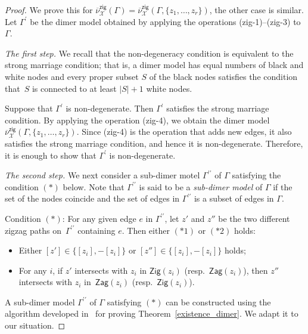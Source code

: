 \documentclass[11pt]{article}
\numberwithin{equation}{section}
\numberwithin{equation}{section}
\numberwithin{figure}{section}
\numberwithin{table}{section}
\newcommand{\calX}{\mathcal{X}}
\newcommand{\Zig}{\mathsf{Zig}}
\newcommand{\Zag}{\mathsf{Zag}}
\newcommand{\zig}{\mathsf{zig}}
\begin{document}
\begin{proof}
We prove this for $\overline{\nu}^\zig_\calX(\Gamma)=\overline{\nu}^\zig_\calX(\Gamma, \{z_1,\dots,z_r\})$, the other case is similar.
Let $\Gamma^\prime$ be the dimer model obtained by applying the operations (zig-1)--(zig-3) to $\Gamma$.

{\it The first step.}
We recall that the non-degeneracy condition is equivalent to the strong marriage condition; that is, a dimer model has equal numbers of black and white nodes and every proper subset $S$ of the black nodes satisfies the condition that~$S$ is connected to at least $|S|+1$ white nodes.

Suppose that $\Gamma^\prime$ is non-degenerate. Then $\Gamma^\prime$ satisfies the strong marriage condition.
By applying the operation (zig-4), we obtain the dimer model $\overline{\nu}^\zig_\calX(\Gamma, \{z_1,\dots,z_r\})$.
Since (zig-4) is the operation that adds new edges, it also satisfies the strong marriage condition, and hence it is non-degenerate.
Therefore, it is enough to show that $\Gamma^\prime$ is non-degenerate.

{\it The second step.}
We next consider a sub-dimer motel $\Gamma^{\prime \prime}$ of $\Gamma$ satisfying the condition $(*)$ below.
Note that $\Gamma^{\prime\prime}$ is said to be a \emph{sub-dimer model} of $\Gamma$
if the set of the nodes coincide and the set of edges in $\Gamma^{\prime\prime}$ is a subset of edges in $\Gamma$.

Condition $(*)$: For any given edge $e$ in $\Gamma^{\prime\prime}$,
let $z'$ and $z''$ be the two different zigzag paths on~$\Gamma^{\prime\prime}$ containing $e$.
Then either $(*1)$ or $(*2)$ holds:
\begin{itemize}
\setlength{\parskip}{0pt}
\itemsep=0pt
\setlength{\leftskip}{0.3cm}
\item[$(*1)$] Either $[z'] \in \{[z_i],-[z_i]\}$ or $[z''] \in \{[z_i],-[z_i]\}$ holds;
\item[$(*2)$] For any $i$, if $z'$ intersects with $z_i$ in $\Zig(z_i)$ (resp.~$\Zag(z_i)$), then $z''$ intersects with $z_i$ in~$\Zag(z_i)$ (resp.~$\Zig(z_i)$).
\end{itemize}

A sub-dimer model $\Gamma^{\prime \prime}$ of $\Gamma$ satisfying $(*)$ can be constructed using
the algorithm developed in~\cite{Gul,IU2} for proving Theorem~\ref{existence_dimer}.
We adapt it to our situation.


\end{proof}
\end{document}
